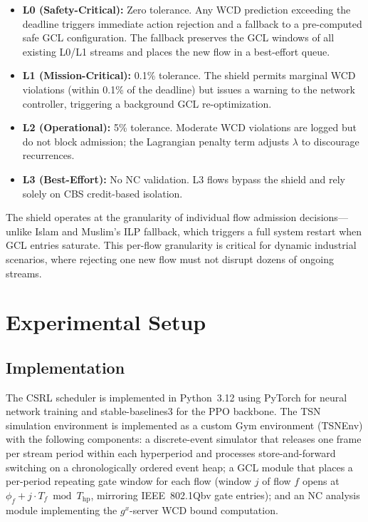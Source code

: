 \documentclass[conference]{IEEEtran}
\begin{document}
\begin{itemize}
\item \textbf{L0 (Safety-Critical):} Zero tolerance. Any WCD prediction exceeding the deadline triggers immediate action rejection and a fallback to a pre-computed safe GCL configuration. The fallback preserves the GCL windows of all existing L0/L1 streams and places the new flow in a best-effort queue.
\item \textbf{L1 (Mission-Critical):} 0.1\% tolerance. The shield permits marginal WCD violations (within 0.1\% of the deadline) but issues a warning to the network controller, triggering a background GCL re-optimization.
\item \textbf{L2 (Operational):} 5\% tolerance. Moderate WCD violations are logged but do not block admission; the Lagrangian penalty term adjusts $\lambda$ to discourage recurrences.
\item \textbf{L3 (Best-Effort):} No NC validation. L3 flows bypass the shield and rely solely on CBS credit-based isolation.
\end{itemize}

The shield operates at the granularity of individual flow admission decisions---unlike Islam and Muslim's ILP fallback, which triggers a full system restart when GCL entries saturate. This per-flow granularity is critical for dynamic industrial scenarios, where rejecting one new flow must not disrupt dozens of ongoing streams.

\section{Experimental Setup}

\subsection{Implementation}

The CSRL scheduler is implemented in Python~3.12 using PyTorch for neural network training and stable-baselines3 for the PPO backbone. The TSN simulation environment is implemented as a custom Gym environment (TSNEnv) with the following components: a discrete-event simulator that releases one frame per stream period within each hyperperiod and processes store-and-forward switching on a chronologically ordered event heap; a GCL module that places a per-period repeating gate window for each flow (window $j$ of flow $f$ opens at $\phi_f + j \cdot T_f \bmod T_{\text{hp}}$, mirroring IEEE~802.1Qbv gate entries); and an NC analysis module implementing the $g^x$-server WCD bound computation.
\end{document}
